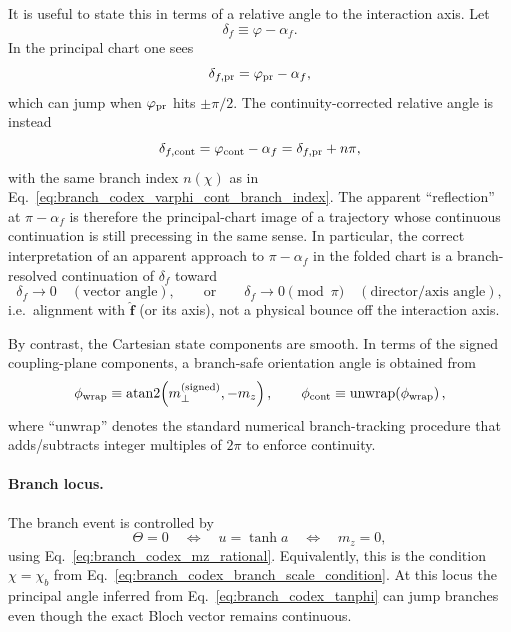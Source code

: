 It is useful to state this in terms of a relative angle to the interaction
axis.  Let
\begin{equation}
    \delta_f \equiv \varphi - \alpha_f .
    \label{eq:branch_codex_deltaf_def}
\end{equation}
In the principal chart one sees
\begin{equation}
    \delta_{f,\rm pr} = \varphi_{\rm pr}-\alpha_f,
\end{equation}
which can jump when $\varphi_{\rm pr}$ hits $\pm \pi/2$.  The continuity-corrected
relative angle is instead
\begin{equation}
    \delta_{f,\rm cont}
    = \varphi_{\rm cont}-\alpha_f
    = \delta_{f,\rm pr} + n\pi,
    \label{eq:branch_codex_deltaf_cont}
\end{equation}
with the same branch index $n(\chi)$ as in
Eq.~\eqref{eq:branch_codex_varphi_cont_branch_index}.  The apparent
``reflection'' at $\pi-\alpha_f$ is therefore the principal-chart image of a
trajectory whose continuous continuation is still precessing in the same sense.
In particular, the correct interpretation of an apparent approach to
$\pi-\alpha_f$ in the folded chart is a branch-resolved continuation of
$\delta_f$ toward
\begin{equation}
    \delta_f \to 0
    \quad (\text{vector angle}),
    \qquad\text{or}\qquad
    \delta_f \to 0 \pmod{\pi}
    \quad (\text{director/axis angle}),
\end{equation}
i.e.\ alignment with $\hat{\mathbf f}$ (or its axis), not a physical bounce
off the interaction axis.

By contrast, the Cartesian state components are smooth.  In terms of the signed
coupling-plane components, a branch-safe orientation angle is obtained from
\begin{equation}
    \phi_{\rm wrap}
    \equiv \operatorname{atan2}\!\left(m_\perp^{(\mathrm{signed})},-m_z\right),
    \qquad
    \phi_{\rm cont} \equiv \operatorname{unwrap}\!\left(\phi_{\rm wrap}\right),
    \label{eq:branch_codex_phi_cont}
\end{equation}
where ``unwrap'' denotes the standard numerical branch-tracking procedure that
adds/subtracts integer multiples of $2\pi$ to enforce continuity.

\paragraph{Branch locus.}
The branch event is controlled by
\begin{equation}
    \Theta=0
    \quad\Longleftrightarrow\quad
    u=\tanh a
    \quad\Longleftrightarrow\quad
    m_z=0,
    \label{eq:branch_codex_locus}
\end{equation}
using Eq.~\eqref{eq:branch_codex_mz_rational}.  Equivalently, this is the
condition $\chi=\chi_b$ from Eq.~\eqref{eq:branch_codex_branch_scale_condition}.
At this locus the principal angle inferred from
Eq.~\eqref{eq:branch_codex_tanphi} can jump branches even though the exact
Bloch vector remains continuous.

